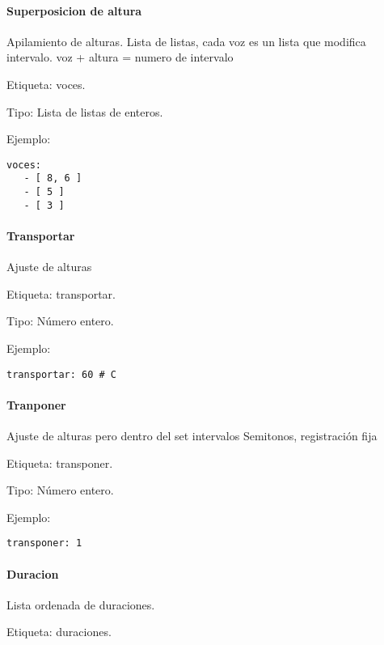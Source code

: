 \documentclass[]{article}
\let\oldparagraph\paragraph
\renewcommand{\paragraph}[1]{\oldparagraph{#1}\mbox{}}
\begin{document}
\hypertarget{superposicion-de-altura}{%
\paragraph{Superposicion de altura}\label{superposicion-de-altura}}

Apilamiento de alturas. Lista de listas, cada voz es un lista que
modifica intervalo. voz + altura = numero de intervalo

Etiqueta: voces.

Tipo: Lista de listas de enteros.

Ejemplo:

\begin{Verbatim}
voces:
   - [ 8, 6 ] 
   - [ 5 ] 
   - [ 3 ]
\end{Verbatim}

\hypertarget{transportar}{%
\paragraph{Transportar}\label{transportar}}

Ajuste de alturas

Etiqueta: transportar.

Tipo: Número entero.

Ejemplo:

\begin{Verbatim}
transportar: 60 # C
\end{Verbatim}

\hypertarget{tranponer}{%
\paragraph{Tranponer}\label{tranponer}}

Ajuste de alturas pero dentro del set intervalos Semitonos, registración
fija

Etiqueta: transponer.

Tipo: Número entero.

Ejemplo:

\begin{Verbatim}
transponer: 1
\end{Verbatim}

\hypertarget{duracion}{%
\paragraph{Duracion}\label{duracion}}

Lista ordenada de duraciones.

Etiqueta: duraciones.
\end{document}
